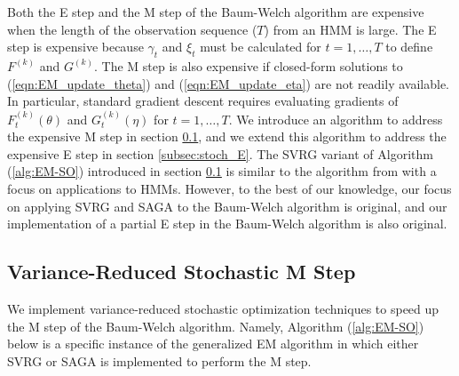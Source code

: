 
Both the E step and the M step of the Baum-Welch algorithm are expensive when the length of the observation sequence ($T$) from an HMM is large. The E step is expensive because $\gamma_t$ and $\xi_t$ must be calculated for $t = 1,\ldots,T$ to define $F^{(k)}$ and $G^{(k)}$. The M step is also expensive if closed-form solutions to (\ref{eqn:EM_update_theta}) and (\ref{eqn:EM_update_eta}) are not readily available. In particular, standard gradient descent requires evaluating gradients of $F^{(k)}_t(\theta)$ and $G^{(k)}_t(\eta)$ for $t = 1,\ldots,T$. We introduce an algorithm to address the expensive M step in section \ref{subsec:stoch_M}, and we extend this algorithm to address the expensive E step in section \ref{subsec:stoch_E}. The SVRG variant of Algorithm (\ref{alg:EM-SO}) introduced in section \ref{subsec:stoch_M} is similar to the algorithm from \citet{Zhu:2017} with a focus on applications to HMMs. However, to the best of our knowledge, our focus on applying SVRG and SAGA to the Baum-Welch algorithm is original, and our implementation of a partial E step in the Baum-Welch algorithm is also original. 

\subsection{Variance-Reduced Stochastic M Step}
\label{subsec:stoch_M}

We implement variance-reduced stochastic optimization techniques to speed up the M step of the Baum-Welch algorithm. Namely, Algorithm (\ref{alg:EM-SO}) below is a specific instance of the generalized EM algorithm \citep{Dempster:1977} in which either SVRG or SAGA is implemented to perform the M step. 



